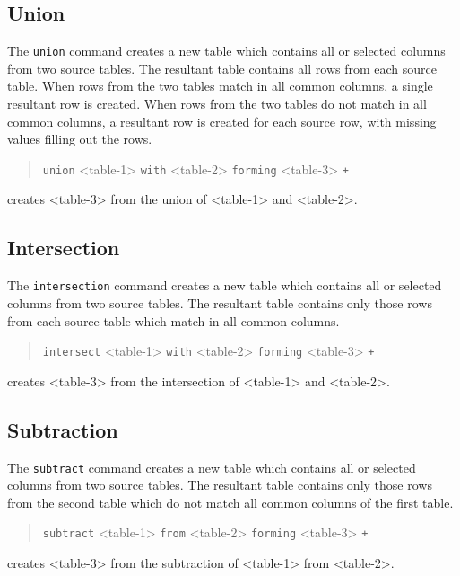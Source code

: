 \documentclass[11pt,a4paper]{report}
\begin{document}
\subsection{Union}
%
The \verb!union! command creates a new table which contains all
or selected columns from two source tables.  The resultant
table contains all rows from each source table.
When rows from the two tables
match in all common columns, a single resultant row is created.
When rows from the two tables do not
match in all common columns, a resultant row is created
for each source row, with missing values filling out the rows.
\begin{verse}
  \verb!union! <table-1> \verb!with! <table-2> \verb!forming! <table-3> \verb!+!\\
  \qquad  {}
\end{verse}
creates <table-3> from the union of <table-1> and <table-2>.

\subsection{Intersection}
%
The \verb!intersection! command creates a new table which contains all
or selected columns from two source tables.  The resultant
table contains only those rows from each source table
which
match in all common columns.
\begin{verse}
  \verb!intersect! <table-1> \verb!with! <table-2> \verb!forming! <table-3> \verb!+!\\
  \qquad  {}
\end{verse}
creates <table-3> from the intersection of <table-1> and <table-2>.
 
\subsection{Subtraction}
%
The \verb!subtract! command creates a new table which contains all
or selected columns from two source tables.  The resultant
table contains only those rows from the second table
which
do not match all common columns of the first table.
\begin{verse}
  \verb!subtract! <table-1> \verb!from! <table-2> \verb!forming! <table-3> \verb!+!\\
  \qquad  {}
\end{verse}
creates <table-3> from the subtraction of <table-1> from <table-2>.
 
\end{document}
